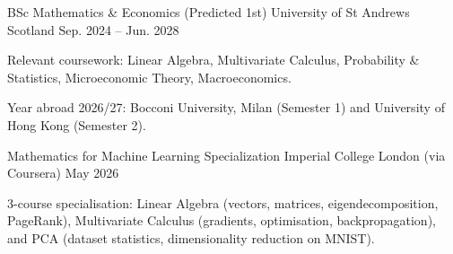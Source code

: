 

\begin{cventries}

  \cventry
    {BSc Mathematics \& Economics (Predicted 1st)} %
    {University of St Andrews} %
    {Scotland} %
    {Sep. 2024 -- Jun. 2028} %
    {
      \begin{cvitems}
        \item {Relevant coursework: Linear Algebra, Multivariate Calculus, Probability \& Statistics, Microeconomic Theory, Macroeconomics.}
        \item {Year abroad 2026/27: Bocconi University, Milan (Semester 1) and University of Hong Kong (Semester 2).}
      \end{cvitems}
    }

  \cventry
    {Mathematics for Machine Learning Specialization} %
    {Imperial College London (via Coursera)} %
    {} %
    {May 2026} %
    {
      \begin{cvitems}
        \item {3-course specialisation: Linear Algebra (vectors, matrices, eigendecomposition, PageRank), Multivariate Calculus (gradients, optimisation, backpropagation), and PCA (dataset statistics, dimensionality reduction on MNIST).}
      \end{cvitems}
    }

\end{cventries}
